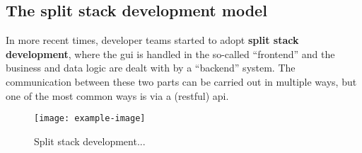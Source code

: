 \subsection{The split stack development model}
\label{ssec:split-stack}


In more recent times, developer teams started to adopt \textbf{split stack
development}, where the \gls{gui} is handled in the so-called ``\gls{frontend}'' and
the business and data logic are dealt with by a ``\gls{backend}'' system. The
communication between these two parts can be carried out in multiple ways, but
one of the most common ways is via a (\gls{restful}) \gls{api}.

\begin{figure} %
    \centering
    \texttt{[image: example-image]}
    \caption[Split stack development]{Split stack development...}
\end{figure}

